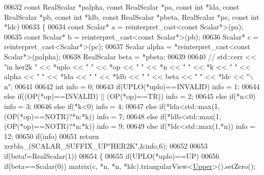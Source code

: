 \begin{DoxyCode}
00632                            \textcolor{keyword}{const} RealScalar *palpha, \textcolor{keyword}{const} RealScalar *pa, \textcolor{keyword}{const} \textcolor{keywordtype}{int} *lda, \textcolor{keyword}{const} RealScalar
       *pb, \textcolor{keyword}{const} \textcolor{keywordtype}{int} *ldb, \textcolor{keyword}{const} RealScalar *pbeta, RealScalar *pc, \textcolor{keyword}{const} \textcolor{keywordtype}{int} *ldc)
00633 \{
00634   \textcolor{keyword}{const} Scalar* a = \textcolor{keyword}{reinterpret\_cast<}\textcolor{keyword}{const }Scalar*\textcolor{keyword}{>}(pa);
00635   \textcolor{keyword}{const} Scalar* b = \textcolor{keyword}{reinterpret\_cast<}\textcolor{keyword}{const }Scalar*\textcolor{keyword}{>}(pb);
00636   Scalar* c = \textcolor{keyword}{reinterpret\_cast<}Scalar*\textcolor{keyword}{>}(pc);
00637   Scalar alpha = *\textcolor{keyword}{reinterpret\_cast<}\textcolor{keyword}{const }Scalar*\textcolor{keyword}{>}(palpha);
00638   RealScalar beta  = *pbeta;
00639 
00640 \textcolor{comment}{//   std::cerr << "in her2k " << *uplo << " " << *op << " " << *n << " " << *k << " " << alpha << " " <<
       *lda << " " << *ldb << " " << beta << " " << *ldc << "\(\backslash\)n";}
00641 
00642   \textcolor{keywordtype}{int} info = 0;
00643   \textcolor{keywordflow}{if}(UPLO(*uplo)==INVALID)                                            info = 1;
00644   \textcolor{keywordflow}{else} \textcolor{keywordflow}{if}((OP(*op)==INVALID) || (OP(*op)==TR))                        info = 2;
00645   \textcolor{keywordflow}{else} \textcolor{keywordflow}{if}(*n<0)                                                       info = 3;
00646   \textcolor{keywordflow}{else} \textcolor{keywordflow}{if}(*k<0)                                                       info = 4;
00647   \textcolor{keywordflow}{else} \textcolor{keywordflow}{if}(*lda<std::max(1,(OP(*op)==NOTR)?*n:*k))                     info = 7;
00648   \textcolor{keywordflow}{else} \textcolor{keywordflow}{if}(*ldb<std::max(1,(OP(*op)==NOTR)?*n:*k))                     info = 9;
00649   \textcolor{keywordflow}{else} \textcolor{keywordflow}{if}(*ldc<std::max(1,*n))                                        info = 12;
00650   \textcolor{keywordflow}{if}(info)
00651     \textcolor{keywordflow}{return} xerbla\_(SCALAR\_SUFFIX\_UP\textcolor{stringliteral}{"HER2K"},&info,6);
00652 
00653   \textcolor{keywordflow}{if}(beta!=RealScalar(1))
00654   \{
00655     \textcolor{keywordflow}{if}(UPLO(*uplo)==UP)
00656       \textcolor{keywordflow}{if}(beta==Scalar(0)) matrix(c, *n, *n, *ldc).triangularView<\hyperlink{group__enums_gga39e3366ff5554d731e7dc8bb642f83cda6bcb58be3b8b8ec84859ce0c5ac0aaec}{Upper}>().setZero();

\end{DoxyCode}
